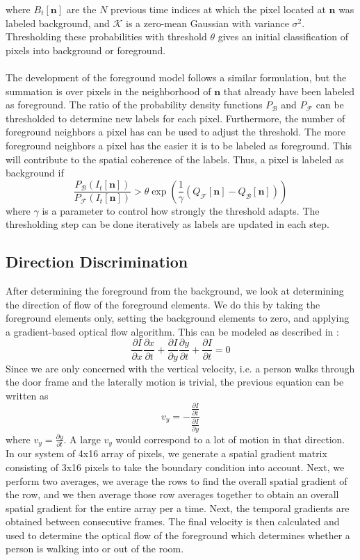 \documentclass[12pt,oneside]{article} %
\begin{document}
where 
$B_t[\mathbf{n}]$ are the $N$ previous time indices at which the pixel located at $\mathbf{n}$ was labeled
background, and $\mathcal{K}$ is a zero-mean Gaussian with variance $\sigma^2$. Thresholding these probabilities
with threshold $\theta$ gives an initial classification of pixels into background or foreground.
\\ \\
The development of the foreground model follows a similar formulation, but the summation is over
pixels in the neighborhood of $\mathbf{n}$ that already have been labeled as foreground. The
ratio of the probability density functions $P_\mathcal{B}$ and 
$P_\mathcal{F}$ can be thresholded to determine new labels for each pixel. Furthermore,
the number of foreground neighbors a pixel has can be used to adjust the threshold. The more foreground
neighbors a pixel has the easier it is to be labeled as foreground. This will contribute to the spatial
coherence of the labels. Thus, a pixel is labeled as background if
$$\frac{P_\mathcal{B}(I_t[\mathbf{n}])}{P_\mathcal{F}(I_t[\mathbf{n}])} > \theta \exp \left(\frac{1}{\gamma} 
	(Q_\mathcal{F}[\mathbf{n}] - Q_\mathcal{B}[\mathbf{n}] )\right)$$
where $\gamma$ is a parameter to control how strongly the threshold
adapts. The thresholding step can be done iteratively as labels are updated in each step.

\subsection{Direction Discrimination}
After determining the foreground from the background, we look at determining the direction of flow of the foreground elements. We do this by taking the foreground elements only, setting the background elements to zero, and applying a gradient-based optical flow algorithm. This can be modeled as described in \cite{Smith97}:
$$\frac{\partial I}{\partial x}\frac{\partial x}{\partial t}+\frac{\partial I}{\partial y}\frac{\partial y}{\partial t} + \frac{\partial I}{\partial t}=0$$
Since we are only concerned with the vertical velocity, i.e. a person walks through the door frame and the laterally motion is trivial, the previous equation can be written as
$$v_y = - \frac{\frac{\partial I}{\partial t}}{\frac{\partial I}{\partial y}}$$
where $v_y =  \frac{\partial y}{\partial t}$. A large $v_y $ would correspond to a lot of motion in that direction. In our system of 4x16 array of pixels, we generate a spatial gradient matrix consisting of 3x16 pixels to take the boundary condition into account. Next, we perform two averages, we average the rows to find the overall spatial gradient of the row, and we then average those row averages together to obtain an overall spatial gradient for the entire array per a time. Next, the temporal gradients are obtained between consecutive frames. The final velocity is then calculated and used to determine the optical flow of the foreground which determines whether a person is walking into or out of the room. 
\end{document}
